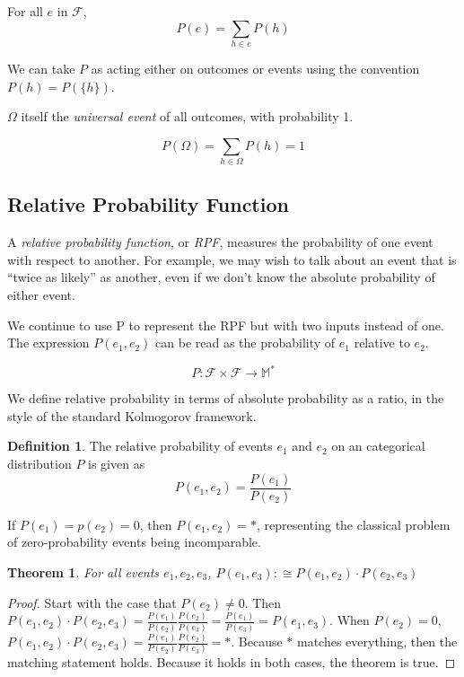 \documentclass[twoside]{article}
\newcommand{\quotes}[1]{``#1''}
\theoremstyle{plain}%
\newtheorem{theorem}{Theorem}[section]
\theoremstyle{definition}
\newtheorem{definition}{Definition}[section]
\theoremstyle{remark}
\begin{document}
For all \(e\) in \(\mathcal{F}\),
\[ P(e) = \sum_{h \in e}{P(h)}\]

We can take \(P\) as acting either on outcomes or events using the convention \(P(h) = P(\{h\})\).

\(\Omega\) itself the \textit{universal event} of all outcomes, with probability 1.

\[P(\Omega) = \sum_{h \in \Omega}{P(h)} = 1\]

\subsection{Relative Probability Function}
\label{section:standard_relative_prob}

A \textit{relative probability function}, or \textit{RPF}, measures the probability of one event with respect to another. For example, we may wish to talk about an event that is \quotes{twice as likely} as another, even if we don't know the absolute probability of either event.

We continue to use P to represent the RPF but with two inputs instead of one. The expression \(P(e_1, e_2)\) can be read as the probability of \(e_1\) relative to \(e_2\).

\[P: \mathcal{F} \times \mathcal{F} \rightarrow \mathbb{M}^*\]

We define relative probability in terms of absolute probability as a ratio, in the style of the standard Kolmogorov framework.

\begin{definition}
\label{def:ratio}
The relative probability of events \(e_1\) and \(e_2\) on an categorical distribution \(P\) is given as
\[P(e_1, e_2) = \frac{P(e_1)}{P(e_2)}\]
\end{definition}

If \(P(e_1) = p(e_2) = 0\), then \(P(e_1, e_2) = \ast\), representing the classical problem of zero-probability events being incomparable.

\begin{theorem}
For all events \(e_1, e_2, e_3\), \(P(e_1, e_3) :\cong P(e_1, e_2) \cdot P(e_2, e_3)\)
\end{theorem}

\begin{proof}
Start with the case that \(P(e_2)\neq 0\). Then \(P(e_1, e_2) \cdot P(e_2, e_3) = \frac{P(e_1)}{P(e_2)}\frac{P(e_2)}{P(e_3)} = \frac{P(e_1)}{P(e_3)} = P(e_1, e_3)\). When \(P(e_2) = 0\), \(P(e_1, e_2) \cdot P(e_2, e_3) = \frac{P(e_1)}{P(e_2)}\frac{P(e_2)}{P(e_3)} = \ast\). Because \(\ast\) matches everything, then the matching statement holds. Because it holds in both cases, the theorem is true.
\end{proof}
\end{document}

